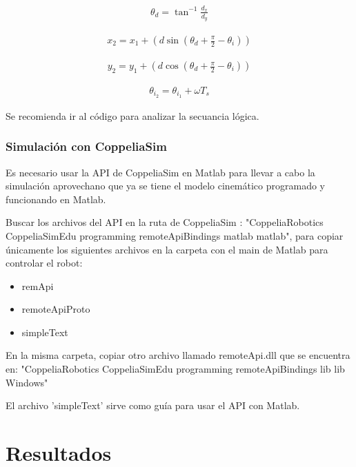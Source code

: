 \documentclass[conference]{IEEEtran}
\begin{document}
\begin{gather}
  \theta_{d} = \tan^{-1}\frac{d_{x}}{d_{y}}
\end{gather}

\begin{gather}\label{newx}
  x_{2} = x_{1} + 
        \left(
          d
          \sin
            \left(
              {\theta_{d} + \frac{\pi}{2} - \theta_{i} }
            \right)  
        \right) 
\end{gather}

\begin{gather}\label{newy}
  y_{2} = y_{1} + 
        \left(
          d
          \cos
            \left(
              {\theta_{d} + \frac{\pi}{2} - \theta_{i} }
            \right)  
        \right) 
\end{gather}

\begin{gather}\label{newt}
  \theta_{i_{2}} = \theta_{i_{1}} + \omega T_{s}
\end{gather}

Se recomienda ir al código para analizar la secuancia lógica.


\subsubsection{Simulación con CoppeliaSim}
Es necesario usar la API de CoppeliaSim en Matlab para llevar a cabo la simulación
aprovechano que ya se tiene el modelo cinemático programado y funcionando en Matlab.

Buscar los archivos del API en la ruta de CoppeliaSim :
"CoppeliaRobotics CoppeliaSimEdu programming remoteApiBindings matlab matlab",
para copiar únicamente los siguientes archivos en la carpeta con el main de Matlab para controlar el robot:
\begin{itemize}
  \item remApi
  \item remoteApiProto
  \item simpleText
\end{itemize}

En la misma carpeta, copiar otro archivo llamado remoteApi.dll que se encuentra en:
"CoppeliaRobotics CoppeliaSimEdu programming remoteApiBindings lib lib Windows"

El archivo 'simpleText' sirve como guía para usar el API con Matlab.

\section{Resultados}
\end{document}
